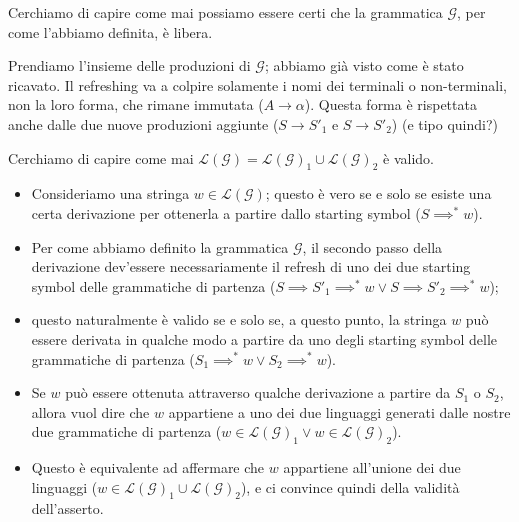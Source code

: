 \documentclass[class=book, crop=false, oneside, 12pt]{standalone}
\begin{document}
\begin{osservazione}
  Cerchiamo di capire come mai possiamo essere certi che la grammatica \(\mathcal{G}\), per come l'abbiamo definita, è libera.

  Prendiamo l'insieme delle produzioni di \(\mathcal{G}\); abbiamo già visto come è stato ricavato. Il refreshing va a colpire solamente i nomi dei terminali o non-terminali, non la loro forma, che rimane immutata (\(A \rightarrow \alpha\)). Questa forma è rispettata anche dalle due nuove produzioni aggiunte (\(S \rightarrow S'_1\) e \(S \rightarrow S'_2\)) (e tipo quindi?)

\end{osservazione}

\begin{osservazione}
  Cerchiamo di capire come mai  \(\mathcal{L(G)} = \mathcal{L(G)_1} \cup \mathcal{L(G)_2}\) è valido.
  \begin{itemize}
    \item Consideriamo una stringa \(w \in \mathcal{L(G)}\); questo è vero se e solo se esiste una certa derivazione per ottenerla a partire dallo starting symbol (\(S \implies^* w\)).
    \item Per come abbiamo definito la grammatica \(\mathcal{G}\), il secondo passo della derivazione dev'essere necessariamente il refresh di uno dei due starting symbol delle grammatiche di partenza (\(S \implies S'_1 \implies^* w \lor S \implies S'_2 \implies^* w\));
    \item questo naturalmente è valido se e solo se, a questo punto, la stringa \(w\) può essere derivata in qualche modo a partire da uno degli starting symbol delle grammatiche di partenza (\(S_1 \implies^* w \lor S_2 \implies^* w\)).
    \item Se \(w\) può essere ottenuta attraverso qualche derivazione a partire da \(S_1\) o \(S_2\), allora vuol dire che \(w\) appartiene a uno dei due linguaggi generati dalle nostre due grammatiche di partenza (\(w \in \mathcal{L(G)}_1 \lor w \in \mathcal{L(G)}_2\)).
    \item Questo è equivalente ad affermare che \(w\) appartiene all'unione dei due linguaggi (\(w \in \mathcal{L(G)}_1 \cup \mathcal{L(G)}_2\)), e ci convince quindi della validità dell'asserto.
  \end{itemize}
\end{osservazione}
\end{document}
